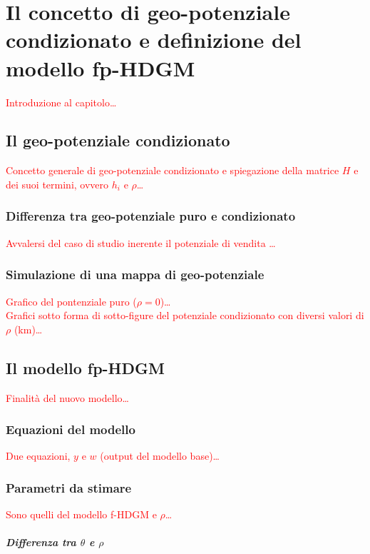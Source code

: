 \chapter[Il concetto di geo-potenziale condizionato e il modello fp-HDGM]{Il concetto di geo-potenziale condizionato e definizione del modello fp-HDGM}

\textcolor{red}{Introduzione al capitolo\dots}

\section[Il geo-potenziale condizionato]{Il geo-potenziale condizionato}
\textcolor{red}{Concetto generale di geo-potenziale condizionato e spiegazione della matrice $H$ e dei suoi termini, ovvero $h_i$ e $\rho$\dots}
\subsection[Differenza tra geo-potenziale puro e condizionato]{Differenza tra geo-potenziale puro e condizionato}
\textcolor{red}{Avvalersi del caso di studio inerente il potenziale di vendita \dots}
\subsection[Simulazione di una mappa di geo-potenziale]{Simulazione di una mappa di geo-potenziale}
\textcolor{red}{Grafico del pontenziale puro ($\rho=0$)\dots}\\
\textcolor{red}{Grafici sotto forma di sotto-figure del potenziale condizionato con diversi valori di $\rho$ (\si{\kilo\meter})\dots}

\section[Il modello fp-HDGM]{Il modello fp-HDGM}
\textcolor{red}{Finalità del nuovo modello\dots}
\subsection[Equazioni del modello]{Equazioni del modello}
\textcolor{red}{Due equazioni, $y$ e $w$ (output del modello base)\dots}
\subsection[Parametri da stimare]{Parametri da stimare}
\textcolor{red}{Sono quelli del modello f-HDGM e $\rho$\dots}
\paragraph[Differenza tra $\theta$ e $\rho$]{Differenza tra $\theta$ e $\rho$}